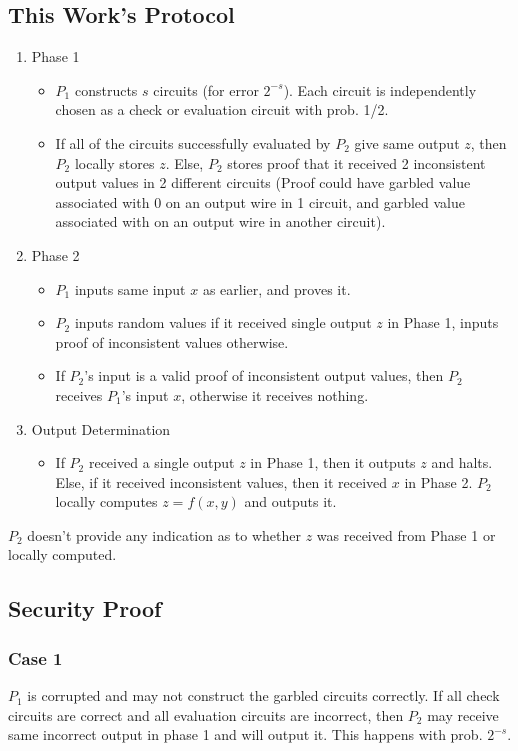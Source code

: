 \subsection{This Work's Protocol}
\begin{enumerate}
    \item Phase 1
    \begin{itemize}
        \item $P_1$ constructs $s$ circuits (for error $2^{-s}$). Each circuit is independently chosen as a check or evaluation circuit with prob. 1/2.
        \item If all of the circuits successfully evaluated by $P_2$ give same output $z$, then $P_2$ locally stores $z$. Else, $P_2$ stores proof that it received 2 inconsistent output values in 2 different circuits (Proof could have garbled value associated with 0 on an output wire in 1 circuit, and garbled value associated with on an output wire in another circuit).
    \end{itemize}
    \item Phase 2
    \begin{itemize}
        \item $P_1$ inputs same input $x$ as earlier, and proves it.
        \item $P_2$ inputs random values if it received single output $z$ in Phase 1, inputs proof of inconsistent values otherwise.
        \item If $P_2$'s input is a valid proof of inconsistent output values, then $P_2$ receives $P_1$'s input $x$, otherwise it receives nothing.
    \end{itemize}
    \item Output Determination
    \begin{itemize}
        \item If $P_2$ received a single output $z$ in Phase 1, then it outputs $z$ and halts. Else, if it received inconsistent values, then it received $x$ in Phase 2. $P_2$ locally computes $z = f(x, y)$ and outputs it.
    \end{itemize}
\end{enumerate}

$P_2$ doesn't provide any indication as to whether $z$ was received from Phase 1 or locally computed.

\subsection{Security Proof}
\subsubsection{Case 1}
$P_1$ is corrupted and may not construct the garbled circuits correctly. If all check circuits are correct and all evaluation circuits are incorrect, then $P_2$ may receive same incorrect output in phase 1 and will output it. This happens with prob. $2^{-s}$.\\

